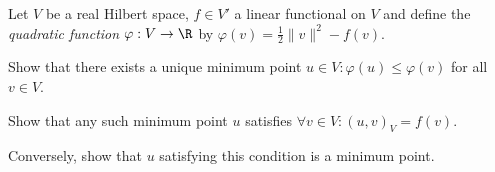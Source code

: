 Let $V$ be a real Hilbert space, $f\in V'$ a linear functional on $V$
and define the \emph{quadratic function} $\varphi:V\rightarrow \R$ by
$\varphi(v)=\frac{1}{2}\|v\|^2-f(v)$.
\begin{alist}
\item Show that there exists a unique minimum point $u\in
V:\varphi(u)\leq \varphi(v)$ for all $v\in V$.
\item Show that any such minimum point $u$ satisfies 
$ \forall v\in V:(u,v)_V=f(v)$.
\item Conversely, show that $u$ satisfying this condition is a minimum
point.
\end{alist}

